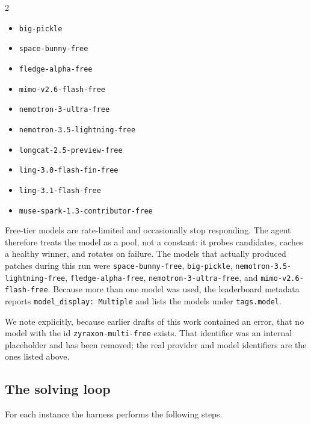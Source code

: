 \documentclass[11pt,a4paper]{article}
\begin{document}
\begin{multicols}{2}
\begin{itemize}[leftmargin=1.2em]
  \item \texttt{big-pickle}
  \item \texttt{space-bunny-free}
  \item \texttt{fledge-alpha-free}
  \item \texttt{mimo-v2.6-flash-free}
  \item \texttt{nemotron-3-ultra-free}
  \item \texttt{nemotron-3.5-lightning-free}
  \item \texttt{longcat-2.5-preview-free}
  \item \texttt{ling-3.0-flash-fin-free}
  \item \texttt{ling-3.1-flash-free}
  \item \texttt{muse-spark-1.3-contributor-free}
\end{itemize}
\end{multicols}

Free-tier models are rate-limited and occasionally stop responding. The agent therefore
treats the model as a pool, not a constant: it probes candidates, caches a healthy
winner, and rotates on failure. The models that actually produced patches during this run
were \texttt{space-bunny-free}, \texttt{big-pickle}, \texttt{nemotron-3.5-lightning-free},
\texttt{fledge-alpha-free}, \texttt{nemotron-3-ultra-free}, and
\texttt{mimo-v2.6-flash-free}. Because more than one model was used, the leaderboard
metadata reports \texttt{model\_display: Multiple} and lists the models under
\texttt{tags.model}.

We note explicitly, because earlier drafts of this work contained an error, that no
model with the id \texttt{zyraxon-multi-free} exists. That identifier was an internal
placeholder and has been removed; the real provider and model identifiers are the ones
listed above.

\subsection{The solving loop}

For each instance the harness performs the following steps.
\end{document}
